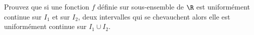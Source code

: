 
\begin{exercice}\label{exo0092}


Prouvez que si une fonction $f$ définie sur sous-ensemble de $\R$ est uniformément continue sur $I_1$ et sur $I_2$, deux intervalles qui se chevauchent alors elle est uniformément continue sur $I_1 \cup I_2$.

\end{exercice}
